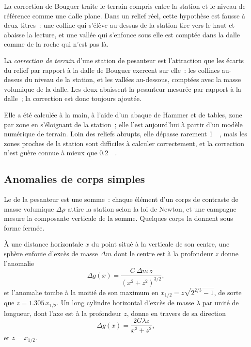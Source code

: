 La correction de Bouguer traite le terrain compris entre la station et le
niveau de référence comme une dalle plane. Dans un relief réel, cette hypothèse est fausse à deux titres~:
une colline qui s'élève au-dessus de la station tire vers le haut et abaisse la
lecture, et une vallée qui s'enfonce sous elle est comptée dans la dalle comme
de la roche qui n'est pas là.

\begin{definition}\label{def:b3:field-lab-methods-3:terrain}
La \emph{correction de terrain} d'une station de
pesanteur est l'attraction que les écarts du relief par rapport à la
dalle de Bouguer exercent sur elle~: les collines au-dessus du niveau de la station, et
les vallées au-dessous, comptées avec la masse volumique de la dalle. Les deux abaissent la
pesanteur mesurée par rapport à la dalle~; la correction est donc
toujours ajoutée.
\end{definition}

Elle a été calculée à la main, à l'aide d'un abaque de Hammer et de tables, zone par zone
en s'éloignant de la station~; elle l'est aujourd'hui à partir
d'un modèle numérique de terrain. Loin des reliefs abrupts, elle dépasse rarement \qty{1}{\milli\gal},
mais les zones proches de la station sont difficiles à calculer correctement, et la
correction n'est guère connue à mieux que \qty{0.2}{\milli\gal}.

\subsection{Anomalies de corps simples}

Le  de la pesanteur est une somme~: chaque élément d'un corps de
contraste de masse volumique $\Delta\rho$ attire la station selon la loi de Newton, et
une campagne mesure la composante verticale de la somme. Quelques corps la donnent
sous forme fermée.

\begin{theorem}\label{thm:b3:field-lab-methods-3:sphere}
À une distance horizontale $x$ du point situé à la verticale de son centre, une sphère
enfouie d'excès de masse $\Delta m$ dont le centre est à la profondeur $z$
donne l'anomalie
\[
\Delta g(x) = \frac{G\,\Delta m\,z}{(x^2 + z^2)^{3/2}} ,
\]
et l'anomalie tombe à la moitié de son maximum en $x_{1/2} = z\sqrt{2^{2/3} - 1}$,
de sorte que $z = 1.305\,x_{1/2}$. Un long cylindre horizontal d'excès de masse
$\lambda$ par unité de longueur, dont l'axe est à la profondeur $z$, donne en travers
de sa direction
\[
\Delta g(x) = \frac{2G\lambda z}{x^2 + z^2} ,
\]
et $z = x_{1/2}$.
\end{theorem}

